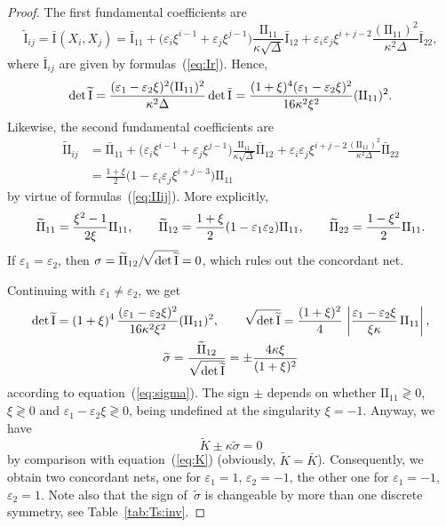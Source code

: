 \documentclass[pdftex]{sigma}
\def\II#1#2{\mathrm{II}_{#1#2}}
\def\barI#1#2{\bar{\mathrm{I}}_{#1#2}}
\def\barII#1#2{\bar{\mathrm{II}}_{#1#2}}
\def\tilI#1#2{\widetilde{\mathrm{I}}_{#1#2}}
\def\tilII#1#2{\widetilde{\mathrm{II}}_{#1#2}}
\let\epsilon\varepsilon
\def\k{\kappa}
\def\eqref#1{{\rm(\ref{#1})}}
\numberwithin{equation}{section}
\begin{document}
\begin{proof}
The first fundamental coefficients are
\[
\tilI ij  = \barI{}{}(X_{i},X_{j})
 = \barI11
   + \bigl(\epsilon_i \xi^{i-1}
   + \epsilon_j \xi^{j-1}\bigr) \frac{\II 11}{\k\sqrt{\Delta}} \barI12
   + \epsilon_i\epsilon_j \xi^{i+j-2} \frac{(\II 11)^2}{\k^2\Delta} \barI22,
\]
where $\barI ij$ are given by formulas~\eqref{eq:Ir}.
Hence, %
\[
\det \widetilde{{\rm I}}
  = \frac{(\epsilon_1 - \epsilon_2 \xi)^2 (\II 11)^2}{\k^2\Delta} \det\barI{}{}
  = \frac{(1 + \xi)^4 (\epsilon_1 - \epsilon_2 \xi)^2}{16 \k^2 \xi^2}
     (\II 11)^2.
\]
Likewise, the second fundamental coefficients are %
\begin{align*}
\tilII ij
& = \barII11
   + \bigl(\epsilon_i \xi^{i-1}
   + \epsilon_j \xi^{j-1}\bigr) \frac{\II 11}{\k\sqrt{\Delta}} \barII12
   + \epsilon_i\epsilon_j \xi^{i+j-2} \frac{(\II 11)^2}{\k^2\Delta} \barII22\\
 & = \frac{1 + \xi}{2} \bigl(1 - \epsilon_i\epsilon_j \xi^{i+j-3}\bigr) \II 11
\end{align*}
by virtue of formulas~\eqref{eq:IIij}.
More explicitly,{\samepage
\[
\widetilde{{\rm II}}_{11}
 =  \frac{\xi^2 - 1}{2 \xi} \II 11,
\qquad
\widetilde{{\rm II}}_{12}
 = \frac{1 + \xi}{2} (1 - \epsilon_1\epsilon_2) \II 11,
\qquad
\widetilde{{\rm II}}_{22}
 = \frac{1 - \xi^2}{2} \II 11.
\]
If $\epsilon_1 = \epsilon_2$, then
$\sigma = \widetilde{{\rm II}}_{12}/\!\sqrt{\det \widetilde{{\rm I}}} = 0$,
which rules out the concordant net.}

Continuing with $\epsilon_1 \ne \epsilon_2$, we get
\begin{gather*}
\det \widetilde{{\rm I}}
 = (1 + \xi)^4\,
   \frac{(\epsilon_1 - \epsilon_2 \xi)^2}{16 \k^2 \xi^2} (\II11)^2,
\qquad
\sqrt{\det \widetilde{{\rm I}}}
 = \frac{(1 + \xi)^2}{4}\,
   \left|\frac{\epsilon_1 - \epsilon_2 \xi}{\xi \k}\,\II11\right|,
\\
\widetilde\sigma = \frac{\widetilde{{\rm II}}_{12}}{\sqrt{\det \widetilde{{\rm I}}}}
 = \pm\frac{4 \k \xi}
        {(1 + \xi)^2}
\end{gather*}
according to equation~\eqref{eq:sigma}.
The sign $\pm$ depends on whether $\II11 \gtrless 0$, $\xi \gtrless 0$ and
$\epsilon_1 - \epsilon_2 \xi \gtrless 0$,
being undefined at the singularity $\xi = -1$.
Anyway, we have
\[
\widetilde K \pm \kappa \widetilde\sigma = 0
\]
by comparison with equation~\eqref{eq:K} (obviously, $\widetilde K = \bar K$).
Consequently, we obtain two concordant nets,
one for $\epsilon_1 = 1$, $\epsilon_2 = -1$,
the other one for $\epsilon_1 = -1$, $\epsilon_2 = 1$.
Note also that the sign of~$\widetilde\sigma$ is changeable by more than one
discrete symmetry, see Table~\ref{tab:Ts:inv}.


\end{proof}
\end{document}
